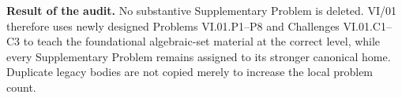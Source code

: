 \bigskip
\noindent
\textbf{Result of the audit.}
No substantive Supplementary Problem is deleted.  VI/01 therefore uses newly designed Problems
VI.01.P1--P8 and Challenges VI.01.C1--C3 to teach the foundational algebraic-set material
at the correct level, while every Supplementary Problem remains assigned to its stronger canonical
home.  Duplicate legacy bodies are not copied merely to increase the local problem count.
